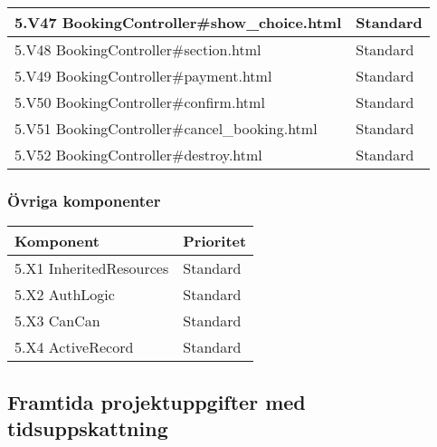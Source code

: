 \documentclass[a4paper, twoside, 11pt, titlepage]{article}
\begin{document}
\begin {table} [ht]
\begin{tabular} {  p{10cm} p{5.1cm} }
			\hline
			{ 5.V47 BookingController\#show\_choice.html } & { Standard } \\
			\hline
			{ 5.V48 BookingController\#section.html } & { Standard } \\
			\hline
			{ 5.V49 BookingController\#payment.html } & { Standard } \\
			\hline
			{ 5.V50 BookingController\#confirm.html } & { Standard } \\
			\hline
			{ 5.V51 BookingController\#cancel\_booking.html } & { Standard } \\
			\hline
			{ 5.V52 BookingController\#destroy.html } & { Standard } \\
			\hline
		\end{tabular} \end{table} \FloatBarrier


		\subsubsection{Övriga komponenter}


		\begin {table} [ht] \begin{tabular} {  p{10cm} p{5.1cm} }
			\hline
			{\sffamily\textbf{Komponent}} & {\sffamily\textbf{Prioritet}} \\
			\hline
			{ 5.X1 InheritedResources} & { Standard } \\
			\hline
			{ 5.X2 AuthLogic } & { Standard } \\
			\hline
			{ 5.X3 CanCan} & { Standard } \\
			\hline
			{ 5.X4 ActiveRecord} & { Standard } \\
			\hline
		\end{tabular} \end{table} \FloatBarrier


	\clearpage %
	\subsection{Framtida projektuppgifter med tidsuppskattning}
\end{document}
